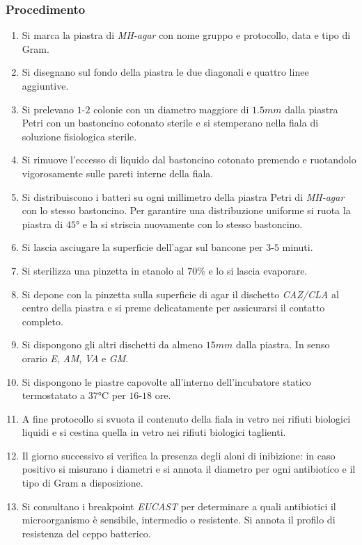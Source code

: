 		\subsubsection{Procedimento}
		\begin{enumerate}
			\item Si marca la piastra di \emph{MH-agar} con nome gruppo e protocollo, data e tipo di Gram.
			\item Si disegnano sul fondo della piastra le due diagonali e quattro linee aggiuntive.
			\item Si prelevano $1$-$2$ colonie con un diametro maggiore di $1.5\si{mm}$ dalla piastra Petri con un bastoncino cotonato sterile e si stemperano nella fiala di soluzione fisiologica sterile.
			\item Si rimuove l'eccesso di liquido dal bastoncino cotonato premendo e ruotandolo vigorosamente sulle pareti interne della fiala.
			\item Si distribuiscono i batteri su ogni millimetro della piastra Petri di \emph{MH-agar} con lo stesso bastoncino.
				Per garantire una distribuzione uniforme si ruota la piastra di $45\si{\degree}$ e la si striscia nuovamente con lo stesso bastoncino.
			\item Si lascia asciugare la superficie dell'agar sul bancone per $3$-$5$ minuti.
			\item Si sterilizza una pinzetta in etanolo al $70\%$ e lo si lascia evaporare.
			\item Si depone con la pinzetta sulla superficie di agar il dischetto \emph{CAZ/CLA} al centro della piastra e si preme delicatamente per assicurarsi il contatto completo.
			\item Si dispongono gli altri dischetti da almeno $15\si{mm}$ dalla piastra.
				In senso orario \emph{E}, \emph{AM}, \emph{VA} e \emph{GM}.
			\item Si dispongono le piastre capovolte all'interno dell'incubatore statico termostatato a $37\si{\celsius}$ per $16$-$18$ ore.
			\item A fine protocollo si svuota il contenuto della fiala in vetro nei rifiuti biologici liquidi e si cestina quella in vetro nei rifiuti biologici taglienti.
			\item Il giorno successivo si verifica la presenza degli aloni di inibizione: in caso positivo si misurano i diametri e si annota il diametro per ogni antibiotico e il tipo di Gram a disposizione.
			\item Si consultano i breakpoint \emph{EUCAST} per determinare a quali antibiotici il microorganismo \`e sensibile, intermedio o resistente.
				Si annota il profilo di resistenza del ceppo batterico.
		\end{enumerate}

